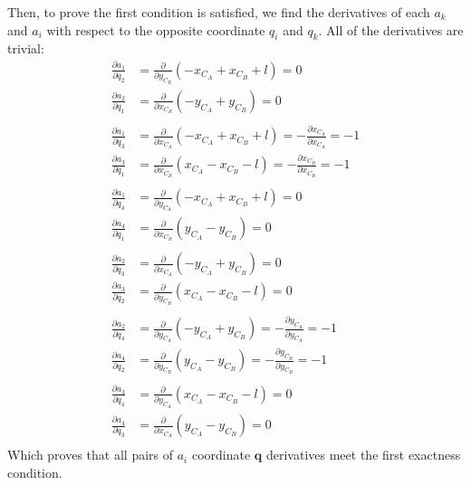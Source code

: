 \documentclass[titlepage]{article}
\begin{document}
\newpage

\begin{mdframed}[linewidth=1pt, innertopmargin=10pt, innerbottommargin=10pt]
	Then, to prove the first condition is satisfied, we find the derivatives of each $a_k$ and $a_i$ with respect to the opposite coordinate $q_i$ and $q_k$. All of the derivatives are trivial:
	\begin{equation}
		\begin{split}
			\frac{\partial a_1}{\partial q_2} &= \frac{\partial}{\partial y_{C_B}}\left(-x_{C_A}+x_{C_B}+l\right)= 0 \\
			\frac{\partial a_2}{\partial q_1} &= \frac{\partial}{\partial x_{C_B}}\left(-y_{C_A}+y_{C_B}\right)= 0\\
			\\
			\frac{\partial a_1}{\partial q_3} &= \frac{\partial}{\partial x_{C_A}}\left(-x_{C_A}+x_{C_B}+l\right)=  -\frac{\partial x_{C_A}}{\partial x_{C_A}}= -1\\
			\frac{\partial a_3}{\partial q_1} &= \frac{\partial}{\partial x_{C_B}}\left(x_{C_A}-x_{C_B}-l\right)= -\frac{\partial x_{C_B}}{\partial x_{C_B}}= -1 \\
			\\
			\frac{\partial a_1}{\partial q_4} &= \frac{\partial}{\partial y_{C_A}}\left(-x_{C_A}+x_{C_B}+l\right)= 0 \\
			\frac{\partial a_4}{\partial q_1} &= \frac{\partial}{\partial x_{C_B}}\left(y_{C_A}-y_{C_B}\right)= 0 \\
			\\
			\frac{\partial a_2}{\partial q_3} &= \frac{\partial}{\partial x_{C_A}}\left(-y_{C_A}+y_{C_B}\right)= 0 \\
			\frac{\partial a_3}{\partial q_2} &= \frac{\partial}{\partial y_{C_B}}\left(x_{C_A}-x_{C_B}-l\right)= 0 \\
			\\
			\frac{\partial a_2}{\partial q_4} &= \frac{\partial}{\partial y_{C_A}}\left(-y_{C_A}+y_{C_B}\right)= -\frac{\partial y_{C_A}}{\partial y_{C_A}}= -1 \\
			\frac{\partial a_4}{\partial q_2} &= \frac{\partial}{\partial y_{C_B}}\left(y_{C_A}-y_{C_B}\right)= -\frac{\partial y_{C_B}}{\partial y_{C_B}}= -1\\
			\\
			\frac{\partial a_3}{\partial q_4} &= \frac{\partial}{\partial y_{C_A}}\left(x_{C_A}-x_{C_B}-l\right)= 0 \\
			\frac{\partial a_4}{\partial q_3} &= \frac{\partial}{\partial x_{C_A}}\left(y_{C_A}-y_{C_B}\right)= 0 \\
		\end{split}
	\end{equation}
	Which proves that all pairs of $a_i$ coordinate $\boldsymbol{q}$ derivatives meet the first exactness condition.
\end{mdframed}
\end{document}
